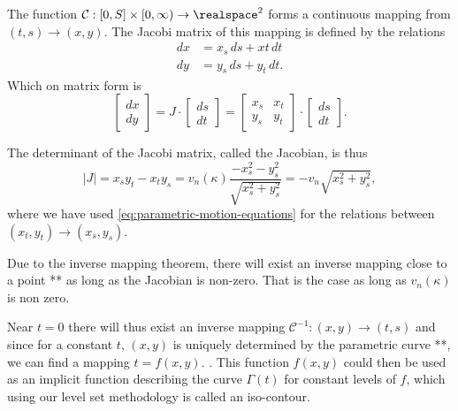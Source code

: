 The function $\mathcal{C} : [0, S]\times [0, \infty) \to \realspace^2$ forms a continuous mapping from $(t, s) \to (x, y)$. The Jacobi matrix of this mapping is defined by the relations 
\begin{align}
    dx &= x_s\, ds + xt\,dt \label{eq:parametric-jacobi-dx} \\
    dy &= y_s \, ds + y_t\, dt \label{eq:parametric-jacobi-dy}.
\end{align}
Which on matrix form is
\begin{equation}
    \begin{bmatrix} dx \\ dy \end{bmatrix} = J \cdot \begin{bmatrix} ds \\dt \end{bmatrix} = \begin{bmatrix}
    x_s & x_t \\ y_s & y_t
    \end{bmatrix} \cdot \begin{bmatrix} ds \\dt \end{bmatrix}.
    \label{eq:parametric-jacobi-relation}
\end{equation}

The determinant of the Jacobi matrix, called the Jacobian, is thus
\begin{equation}
    |J|= x_s y_t - x_t y_s = v_n(\kappa) \frac{-x_s^2 - y_s^2}{\sqrt{x_s^2+y_s^2}} = -v_n \sqrt{x_s^2+y_s^2}, 
    \label{eq:jacobi-velocity-relation}
\end{equation}
where we have used \eqref{eq:parametric-motion-equations} for the relations between $(x_t, y_t)\to (x_s, y_s)$.

Due to the inverse mapping theorem, there will exist an inverse mapping close to a point ** as long as the Jacobian is non-zero. That is the case as long as $v_n(\kappa)$ is non zero.  

Near $t=0$ there will thus exist an inverse mapping $\mathcal{C}^{-1} : (x, y) \to (t, s)$ and since for a constant $t$, $(x, y)$ is uniquely determined by the parametric curve **, we can find a mapping $t = f(x, y)$. . This function $f(x, y)$ could then be used as an implicit function describing the curve $\Gamma (t)$ for constant levels of $f$, which using our level set methodology is called an iso-contour.

